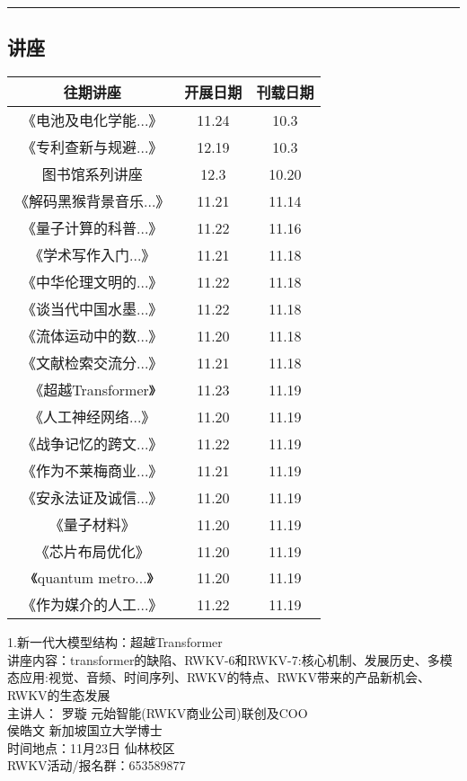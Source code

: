 \documentclass[letterpaper, 12pt]{article}
\begin{document}
\hrule
\pagebreak
\begin{multicols}{2}

\section{讲座}
\begin{tabular}{|c|c|c|}
    \hline
    往期讲座 & 开展日期 & 刊载日期\\
    \hline\hline
    《电池及电化学能...》 & 11.24 & 10.3\\
    《专利查新与规避...》 & 12.19 & 10.3\\
    图书馆系列讲座 & 12.3 & 10.20\\
    《解码黑猴背景音乐...》 & 11.21 & 11.14\\
    《量子计算的科普...》 & 11.22 & 11.16\\
    《学术写作入门...》& 11.21 & 11.18\\
    《中华伦理文明的...》& 11.22 & 11.18\\
    《谈当代中国水墨...》& 11.22 & 11.18\\
    《流体运动中的数...》 &11.20 & 11.18\\
    《文献检索交流分...》 & 11.21 & 11.18\\
    《超越Transformer》 & 11.23 & 11.19\\
    《人工神经网络...》 & 11.20 & 11.19\\
    《战争记忆的跨文...》 & 11.22 & 11.19\\
    《作为不莱梅商业...》 & 11.21 & 11.19\\
    《安永法证及诚信...》 & 11.20 & 11.19\\
    《量子材料》 & 11.20 & 11.19\\
    《芯片布局优化》 & 11.20 & 11.19\\
    《quantum metro...》 & 11.20 & 11.19\\
    《作为媒介的人工...》 & 11.22 & 11.19\\
    \hline
\end{tabular}

1.新一代大模型结构：超越Transformer\\
讲座内容：transformer的缺陷、RWKV-6和RWKV-7:核心机制、发展历史、多模态应用:视觉、音频、时间序列、RWKV的特点、RWKV带来的产品新机会、RWKV的生态发展\\
主讲人：
罗璇 元始智能(RWKV商业公司)联创及COO\\
侯皓文 新加坡国立大学博士\\
时间地点：11月23日 仙林校区\\
RWKV活动/报名群：653589877\\


\end{multicols}
\end{document}

